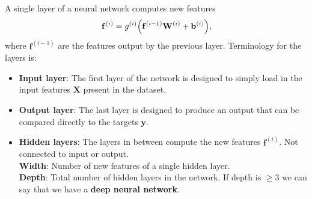 \documentclass[12pt,t]{beamer}
\begin{document}
\begin{frame}

A single layer of a neural network computes new features
$$ \mathbf{f}^{(i)} = g^{(i)} \Bigl(\mathbf{f}^{(i-1)} \mathbf{W}^{(i)} + \mathbf{b}^{(i)}\Bigr),$$
where $\mathbf{f}^{(i-1)}$ are the features output by the previous layer.   Terminology for the layers is:
\begin{itemize}
\item {\bf Input layer}: The first layer of the network is designed to simply load in the input features $\mathbf{X}$ present in the dataset.
\item {\bf Output layer}: The last layer is designed to produce an output that can be compared directly to the targets $\mathbf{y}$.
\item {\bf Hidden layers}: The layers in between compute the new features $\mathbf{f}^{(i)}$.  Not connected to input or output. \\
{\bf Width}: Number of new features of a single hidden layer. \\
{\bf Depth}: Total number of hidden layers in the network.  If depth is $\geq 3$ we can say that we have a {\bf deep neural network}.
\end{itemize}
\end{frame}
\end{document}
